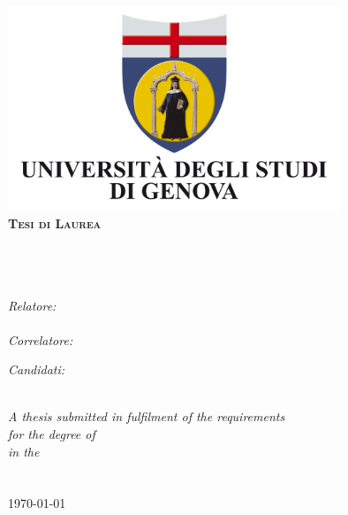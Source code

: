 \documentclass[12pt, twosides]{Thesis} %
\begin{document}
\begin{titlepage}
\begin{center}

\includegraphics[width=9.98cm,height=6.1cm]{Figures/UNIGE.jpg}\\[1cm]

\textsc{\Large \textbf{Tesi di Laurea}}\\[0.5cm] %

\HRule \\[0.4cm] %
{\huge \bfseries \ttitle}\\[0.4cm] %
\HRule \\[1.5cm] %
 
\begin{minipage}{0.45\textwidth}
\begin{flushleft} \large
\emph{Relatore:} \\
\href{http://goo.gl/JQlltW}{\supname} \\ %
\emph{Correlatore:} \\
{\crelator}
\end{flushleft}
\end{minipage}
\begin{minipage}{0.45\textwidth}
\begin{flushright} \large\emph{Candidati:}\\
{\nauthors} %
\end{flushright}
\end{minipage}\\[2.1cm]
 
\large \textit{A thesis submitted in fulfilment of the requirements\\ for the degree of \degreename}\\[0.3cm] %
\textit{in the}\\[0.4cm]
\groupname\\\deptname\\[1.0cm] %
 
{\large \today}\\[4cm] %
 
\vfill
\end{center}

\end{titlepage}
\end{document}
